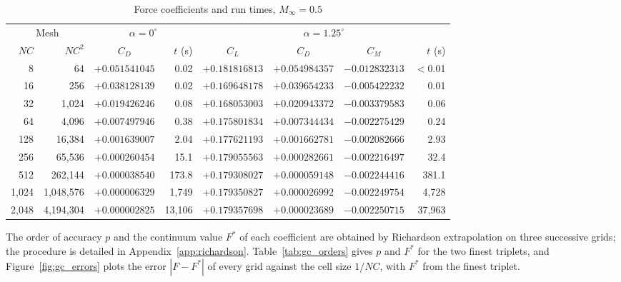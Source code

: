 \documentclass[12pt,a4paper]{article}
\begin{document}
\begin{table}[H]
\centering
\caption{Force coefficients and run times, $M_\infty=0.5$}
\label{tab:gc_forces}
\footnotesize
\setlength{\tabcolsep}{4pt}
\renewcommand{\arraystretch}{1.0}
\begin{tabular}{@{}rrcrcccr@{}}
\toprule
\multicolumn{2}{c}{Mesh} & \multicolumn{2}{c}{$\alpha=0^\circ$} & \multicolumn{4}{c}{$\alpha=1.25^\circ$} \\
\cmidrule(lr){1-2}\cmidrule(lr){3-4}\cmidrule(l){5-8}
$NC$ & $NC^2$ & $C_D$ & $t$ (s) & $C_L$ & $C_D$ & $C_M$ & $t$ (s) \\
\midrule
8 & 64 & $+0.051541045$ & 0.02 & $+0.181816813$ & $+0.054984357$ & $-0.012832313$ & $<$0.01 \\
16 & 256 & $+0.038128139$ & 0.02 & $+0.169648178$ & $+0.039654233$ & $-0.005422232$ & 0.01 \\
32 & 1{,}024 & $+0.019426246$ & 0.08 & $+0.168053003$ & $+0.020943372$ & $-0.003379583$ & 0.06 \\
64 & 4{,}096 & $+0.007497946$ & 0.38 & $+0.175801834$ & $+0.007344434$ & $-0.002275429$ & 0.24 \\
128 & 16{,}384 & $+0.001639007$ & 2.04 & $+0.177621193$ & $+0.001662781$ & $-0.002082666$ & 2.93 \\
256 & 65{,}536 & $+0.000260454$ & 15.1 & $+0.179055563$ & $+0.000282661$ & $-0.002216497$ & 32.4 \\
512 & 262{,}144 & $+0.000038540$ & 173.8 & $+0.179308027$ & $+0.000059148$ & $-0.002244416$ & 381.1 \\
1{,}024 & 1{,}048{,}576 & $+0.000006329$ & 1{,}749 & $+0.179350827$ & $+0.000026992$ & $-0.002249754$ & 4{,}728 \\
2{,}048 & 4{,}194{,}304 & $+0.000002825$ & 13{,}106 & $+0.179357698$ & $+0.000023689$ & $-0.002250715$ & 37{,}963 \\
\bottomrule
\end{tabular}
\end{table}

The order of accuracy $p$ and the continuum value $F^*$ of each coefficient are obtained by
Richardson extrapolation on three successive grids; the procedure is
detailed in Appendix~\ref{app:richardson}. Table~\ref{tab:gc_orders} gives $p$ and $F^*$ for the two finest triplets, and
Figure~\ref{fig:gc_errors} plots the error $|F-F^*|$ of every grid against the cell size $1/NC$,
with $F^*$ from the finest triplet.
\end{document}
